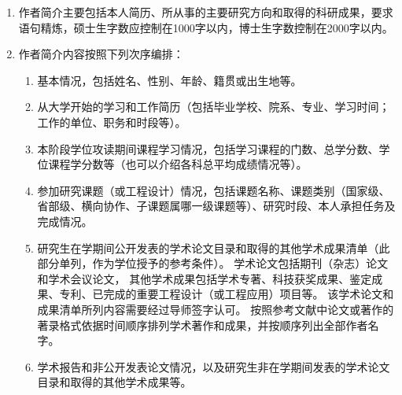 \begin{enumerate}
  \item 作者简介主要包括本人简历、所从事的主要研究方向和取得的科研成果，要求语句精炼，硕士生字数应控制在1000字以内，博士生字数控制在2000字以内。
  \item 作者简介内容按照下列次序编排：
  \begin{enumerate}
    \item 基本情况，包括姓名、性别、年龄、籍贯或出生地等。
    \item 从大学开始的学习和工作简历（包括毕业学校、院系、专业、学习时间；工作的单位、职务和时段等）。
    \item 本阶段学位攻读期间课程学习情况，包括学习课程的门数、总学分数、学位课程学分数等（也可以介绍各科总平均成绩情况等）。
    \item 参加研究课题（或工程设计）情况，包括课题名称、课题类别（国家级、省部级、横向协作、子课题属哪一级课题等）、研究时段、本人承担任务及完成情况。
    \item 研究生在学期间公开发表的学术论文目录和取得的其他学术成果清单（此部分单列，作为学位授予的参考条件）。
    学术论文包括期刊（杂志）论文和学术会议论文，
    其他学术成果包括学术专著、科技获奖成果、鉴定成果、专利、已完成的重要工程设计（或工程应用）项目等。
    该学术论文和成果清单所列内容需要经过导师签字认可。\newline
    按照参考文献中论文或著作的著录格式依据时间顺序排列学术著作和成果，并按顺序列出全部作者名字。
    \item 学术报告和非公开发表论文情况，以及研究生非在学期间发表的学术论文目录和取得的其他学术成果等。
  \end{enumerate}
\end{enumerate}

